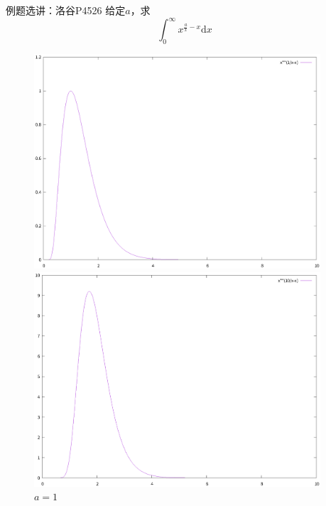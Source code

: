 \documentclass{beamer}
\begin{document}
\begin{frame}{例题选讲：洛谷P4526}
  \small
    给定$a$，求
    \begin{equation*}
        \int_0^\infty x^{\frac{a}{x}-x} \text{d}x
    \end{equation*}

    \pause
    \begin{figure}
        \begin{minipage}[t]{0.32\textwidth}
            \centering
            \includegraphics[width=0.95\textwidth]{pic/p4526-1.eps}
            \caption{$a=1$}
        \end{minipage}
        \begin{minipage}[t]{0.32\textwidth}
            \centering
            \includegraphics[width=0.95\textwidth]{pic/p4526-2.eps}

\end{minipage}
\end{figure}
\end{frame}
\end{document}
